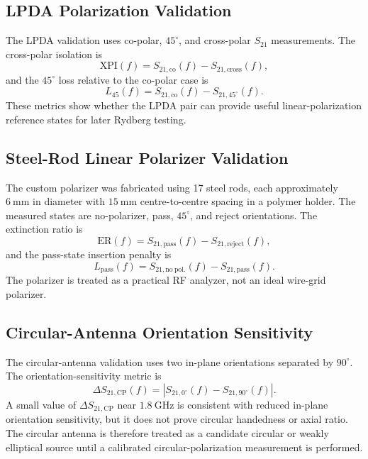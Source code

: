 \documentclass{ieeeaccess}
\begin{document}
\subsection{LPDA Polarization Validation}
\label{annex:rf_lpda_support}

The LPDA validation uses co-polar, \(45^\circ\), and cross-polar \(S_{21}\) measurements. The cross-polar isolation is
\begin{equation}
\mathrm{XPI}(f)
=
S_{21,\mathrm{co}}(f)
-
S_{21,\mathrm{cross}}(f),
\label{eq:annex_xpi}
\end{equation}
and the \(45^\circ\) loss relative to the co-polar case is
\begin{equation}
L_{45}(f)
=
S_{21,\mathrm{co}}(f)
-
S_{21,45^\circ}(f).
\label{eq:annex_l45}
\end{equation}
These metrics show whether the LPDA pair can provide useful linear-polarization reference states for later Rydberg testing.

\subsection{Steel-Rod Linear Polarizer Validation}
\label{annex:rf_polarizer_support}

The custom polarizer was fabricated using 17 steel rods, each approximately \(6~\mathrm{mm}\) in diameter with \(15~\mathrm{mm}\) centre-to-centre spacing in a polymer holder. The measured states are no-polarizer, pass, \(45^\circ\), and reject orientations. The extinction ratio is
\begin{equation}
\mathrm{ER}(f)
=
S_{21,\mathrm{pass}}(f)
-
S_{21,\mathrm{reject}}(f),
\label{eq:annex_er}
\end{equation}
and the pass-state insertion penalty is
\begin{equation}
L_{\mathrm{pass}}(f)
=
S_{21,\mathrm{no\ pol.}}(f)
-
S_{21,\mathrm{pass}}(f).
\label{eq:annex_pass_loss}
\end{equation}
The polarizer is treated as a practical RF analyzer, not an ideal wire-grid polarizer.

\subsection{Circular-Antenna Orientation Sensitivity}
\label{annex:rf_circular_support}

The circular-antenna validation uses two in-plane orientations separated by \(90^\circ\). The orientation-sensitivity metric is
\begin{equation}
\Delta S_{21,\mathrm{CP}}(f)
=
\left|
S_{21,0^\circ}(f)
-
S_{21,90^\circ}(f)
\right|.
\label{eq:annex_cp_delta}
\end{equation}
A small value of \(\Delta S_{21,\mathrm{CP}}\) near \(1.8~\mathrm{GHz}\) is consistent with reduced in-plane orientation sensitivity, but it does not prove circular handedness or axial ratio. The circular antenna is therefore treated as a candidate circular or weakly elliptical source until a calibrated circular-polarization measurement is performed.
\end{document}
